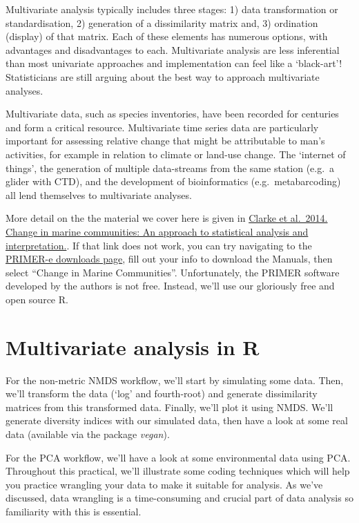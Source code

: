 \documentclass[
  11pt,
  a4paper,
]{book}
\begin{document}
Multivariate analysis typically includes three stages: 1) data transformation or standardisation, 2) generation of a dissimilarity matrix and, 3) ordination (display) of that matrix. Each of these elements has numerous options, with advantages and disadvantages to each. Multivariate analysis are less inferential than most univariate approaches and implementation can feel like a `black-art'! Statisticians are still arguing about the best way to approach multivariate analyses.

Multivariate data, such as species inventories, have been recorded for centuries and form a critical resource. Multivariate time series data are particularly important for assessing relative change that might be attributable to man's activities, for example in relation to climate or land-use change. The `internet of things', the generation of multiple data-streams from the same station (e.g.~a glider with CTD), and the development of bioinformatics (e.g.~metabarcoding) all lend themselves to multivariate analyses.

More detail on the the material we cover here is given in \href{https://www.primer-e.com/wp-content/uploads/2018/10/Change-in-Marine-Communities-3rd-ed.pdf}{Clarke et al.~2014. Change in marine communities: An approach to statistical analysis and interpretation.}. If that link does not work, you can try navigating to the \href{https://www.primer-e.com/download/}{PRIMER-e downloads page}, fill out your info to download the Manuals, then select ``Change in Marine Communities''. Unfortunately, the PRIMER software developed by the authors is not free. Instead, we'll use our gloriously free and open source R.

\hypertarget{multivariate-analysis-in-r}{%
\section{Multivariate analysis in R}\label{multivariate-analysis-in-r}}

For the non-metric NMDS workflow, we'll start by simulating some data. Then, we'll transform the data (`log' and fourth-root) and generate dissimilarity matrices from this transformed data. Finally, we'll plot it using NMDS. We'll generate diversity indices with our simulated data, then have a look at some real data (available via the package \emph{vegan}).

For the PCA workflow, we'll have a look at some environmental data using PCA. Throughout this practical, we'll illustrate some coding techniques which will help you practice wrangling your data to make it suitable for analysis. As we've discussed, data wrangling is a time-consuming and crucial part of data analysis so familiarity with this is essential.
\end{document}
